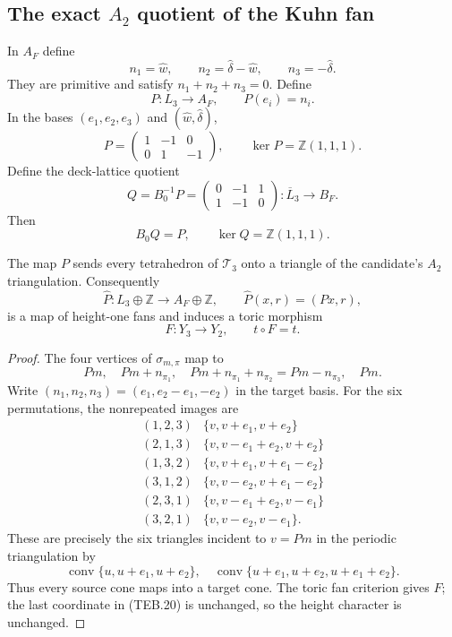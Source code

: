 \subsection{The exact \texorpdfstring{\(A_2\)}{A2} quotient of the Kuhn fan}
\label{subsec:teb-fan-map}

In \(A_F\) define
\[
 n_1=\widehat w,\qquad
 n_2=\widehat\delta-\widehat w,\qquad
 n_3=-\widehat\delta.
 \tag{TEB.15}
\]
They are primitive and satisfy \(n_1+n_2+n_3=0\).  Define
\[
 P:L_3\longrightarrow A_F,
 \qquad P(e_i)=n_i.
 \tag{TEB.16}
\]
In the bases \((e_1,e_2,e_3)\) and
\((\widehat w,\widehat\delta)\),
\[
 P=\begin{pmatrix}1&-1&0\\0&1&-1\end{pmatrix},
 \qquad \ker P=\mathbb Z(1,1,1).
 \tag{TEB.17}
\]
Define the deck-lattice quotient
\[
 Q=B_0^{-1}P=
 \begin{pmatrix}0&-1&1\\1&-1&0\end{pmatrix}:
 \overline L_3\longrightarrow B_F.
 \tag{TEB.18}
\]
Then
\[
 B_0Q=P,\qquad \ker Q=\mathbb Z(1,1,1).
 \tag{TEB.19}
\]

\begin{proposition}
\label{prop:teb-fan-morphism}
The map \(P\) sends every tetrahedron of \(\mathcal T_3\) onto a triangle of
the candidate's \(A_2\) triangulation.  Consequently
\[
 \widehat P:L_3\oplus\mathbb Z\longrightarrow A_F\oplus\mathbb Z,
 \qquad \widehat P(x,r)=(Px,r),
 \tag{TEB.20}
\]
is a map of height-one fans and induces a toric morphism
\[
 F:Y_3\longrightarrow Y_2,
 \qquad t\circ F=t.
 \tag{TEB.21}
\]
\end{proposition}

\begin{proof}
The four vertices of \(\sigma_{m,\pi}\) map to
\[
 Pm,\quad Pm+n_{\pi_1},\quad
 Pm+n_{\pi_1}+n_{\pi_2}=Pm-n_{\pi_3},\quad Pm.
 \tag{TEB.22}
\]
Write \((n_1,n_2,n_3)=(e_1,e_2-e_1,-e_2)\) in the target basis.  For the six
permutations, the nonrepeated images are
\[
\begin{array}{c|c}
(1,2,3)&\{v,v+e_1,v+e_2\}\\
(2,1,3)&\{v,v-e_1+e_2,v+e_2\}\\
(1,3,2)&\{v,v+e_1,v+e_1-e_2\}\\
(3,1,2)&\{v,v-e_2,v+e_1-e_2\}\\
(2,3,1)&\{v,v-e_1+e_2,v-e_1\}\\
(3,2,1)&\{v,v-e_2,v-e_1\}.
\end{array}                                             \tag{TEB.23}
\]
These are precisely the six triangles incident to \(v=Pm\) in the periodic
triangulation by
\[
 \operatorname{conv}\{u,u+e_1,u+e_2\},
 \quad
 \operatorname{conv}\{u+e_1,u+e_2,u+e_1+e_2\}.
\]
Thus every source cone maps into a target cone.  The toric fan criterion gives
\(F\); the last coordinate in (TEB.20) is unchanged, so the height character
is unchanged.
\end{proof}


